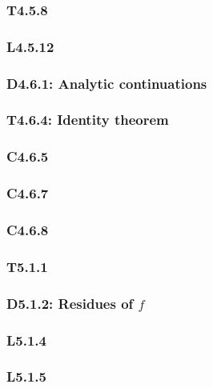 \documentclass{article}
\begin{document}
\begin{multicols*}{3}
\subsubsection*{T4.5.8}

\subsubsection*{L4.5.12}

\newcolumn

\subsubsection*{D4.6.1: Analytic continuations}

\subsubsection*{T4.6.4: Identity theorem}

\subsubsection*{C4.6.5}

\subsubsection*{C4.6.7}

\subsubsection*{C4.6.8}

\newcolumn

\subsubsection*{T5.1.1}

\subsubsection*{D5.1.2: Residues of $f$}

\subsubsection*{L5.1.4}

\subsubsection*{L5.1.5}


\end{multicols*}
\end{document}
